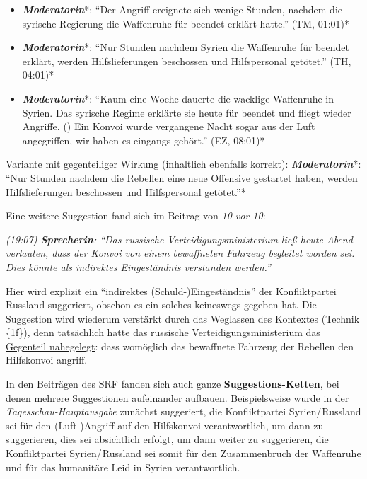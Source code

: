 \begin{itemize}
\tightlist
\item
  \emph{\textbf{Moderatorin}}*: ``Der Angriff ereignete sich wenige
  Stunden, nachdem die syrische Regierung die Waffenruhe für beendet
  erklärt hatte.'' (TM, 01:01)*
\item
  \emph{\textbf{Moderatorin}}*: ``Nur Stunden nachdem Syrien die
  Waffenruhe für beendet erklärt, werden Hilfs­lieferungen beschossen
  und Hilfspersonal getötet.'' (TH, 04:01)*
\item
  \emph{\textbf{Moderatorin}}*: ``Kaum eine Woche dauerte die wacklige
  Waffenruhe in Syrien. Das syrische Regime erklärte sie heute für
  beendet und fliegt wieder Angriffe. () Ein Konvoi wurde vergangene
  Nacht sogar aus der Luft angegriffen, wir haben es eingangs gehört.''
  (EZ, 08:01)*
\end{itemize}

Variante mit gegenteiliger Wirkung (inhaltlich ebenfalls korrekt):
\emph{\textbf{Moderatorin}}*: ``Nur Stunden nachdem die Rebellen eine
neue Offensive gestartet haben, werden Hilfs­­lieferungen beschossen und
Hilfspersonal getötet.''*

Eine weitere Suggestion fand sich im Beitrag von \emph{10 vor 10}:

\emph{(19:07) \textbf{Sprecherin}: ``Das russische
Verteidigungs­ministerium ließ heute Abend verlauten, dass der Konvoi
von einem bewaffneten Fahrzeug begleitet worden sei. Dies könnte als
indirektes Eingeständnis verstanden werden.''}

Hier wird explizit ein ``indirektes (Schuld-)Eingeständnis'' der
Konfliktpartei Russland suggeriert, obschon es ein solches keineswegs
gegeben hat. Die Suggestion wird wiederum verstärkt durch das Weglassen
des Kontextes (Technik \{1f\}), denn tatsächlich hatte das russische
Verteidigungs­ministerium
\href{https://sputniknews.com/middleeast/201609201045521488-aleppo-un-convoy/}{das
Gegenteil nahegelegt}: dass womöglich das bewaffnete Fahrzeug der
Rebellen den Hilfskonvoi angriff.

In den Beiträgen des SRF fanden sich auch ganze
\textbf{Suggestions-Ketten}, bei denen mehrere Suggestionen aufeinander
aufbauen. Bei­spiels­­weise wurde in der \emph{Tagesschau-Hauptausgabe}
zunächst suggeriert, die Konfliktpartei Syrien/ Russland sei für den
(Luft-)Angriff auf den Hilfskonvoi verantwortlich, um dann zu
suggerieren, dies sei absichtlich erfolgt, um dann weiter zu
suggerieren, die Konfliktpartei Syrien/ Russland sei somit für den
Zusammenbruch der Waffenruhe und für das humanitäre Leid in Syrien
verantwortlich.

